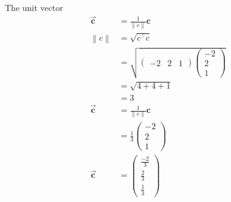\documentclass[12pt]{article}
\newcommand{\myvec}[1]{\ensuremath{\begin{pmatrix}#1\end{pmatrix}}}
\providecommand{\norm}[1]{\left\lVert#1\right\rVert}
\let\vec\mathbf
\begin{document}
\begin{enumerate}
\begin{align}
\end{align}
The unit vector 
\begin{align}
\overrightarrow{\vec{c}}&=\frac{1}{\norm{c}}\vec{c}\\
{\norm{c}}&=\sqrt{c^\top c}\\
&=\sqrt{\myvec{-2& 2& 1}\myvec{-2\\2\\1}}\\
&=\sqrt{4+4+1}\\
&=3\\
\overrightarrow{\vec{c}}&=\frac{1}{\norm{c}}\vec{c}\\
&=\frac{1}{3}\myvec{-2\\2\\1}\\
\overrightarrow{\vec{c}}&=\myvec{\frac{-2}{3}\\[3pt]\frac{2}{3}\\[3pt]\frac{1}{3}}
\end{align}
\end{enumerate} 
\end{document}

